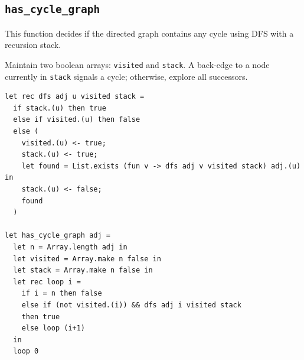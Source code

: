 \subsection{\texttt{has\_cycle\_graph}}
This function decides if the directed graph contains any cycle using DFS with a recursion stack. 

Maintain two boolean arrays: \texttt{visited} and \texttt{stack}. A back-edge to a node currently in \texttt{stack} signals a cycle; otherwise, explore all 
successors. 

\begin{verbatim}
let rec dfs adj u visited stack =
  if stack.(u) then true
  else if visited.(u) then false
  else (
    visited.(u) <- true;
    stack.(u) <- true;
    let found = List.exists (fun v -> dfs adj v visited stack) adj.(u) in
    stack.(u) <- false;
    found
  )

let has_cycle_graph adj =
  let n = Array.length adj in
  let visited = Array.make n false in
  let stack = Array.make n false in
  let rec loop i =
    if i = n then false
    else if (not visited.(i)) && dfs adj i visited stack
    then true
    else loop (i+1)
  in
  loop 0
\end{verbatim}
